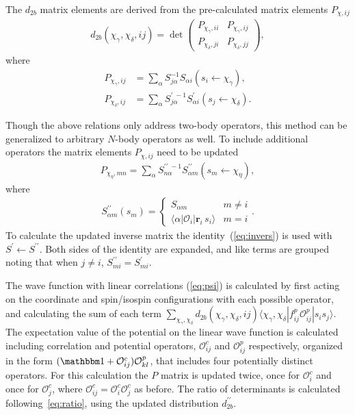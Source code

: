 \documentclass[aps,prc,twocolumn,superscriptaddress,floatfix]{revtex4-1}
\begin{document}
The $d_{2b}$ matrix elements are derived from the pre-calculated matrix elements $P_{\chi,ij}$
\begin{align}
   d_{2b}(\chi_\gamma,\chi_\delta,ij)=\det\begin{pmatrix}P_{\chi_\gamma,ii} & P_{\chi_\gamma,ij} \\ P_{\chi_\delta,ji} & P_{\chi_\delta,jj}\end{pmatrix} ,
\end{align}
where
\begin{align}
   P_{\chi_\gamma,ij} &=\sum_\alpha S^{-1}_{j\alpha}S_{\alpha i}(s_i\leftarrow \chi_\gamma) , \nonumber \\
   P_{\chi_\delta,ij} &=\sum_\alpha S^{\prime\;-1}_{j\alpha}S^\prime_{\alpha i}(s_j\leftarrow \chi_\delta) .
\end{align}

Though the above relations only address two-body operators, 
this method can be generalized to arbitrary $N$-body operators as well. 
To include additional operators the matrix elements $P_{\chi,ij}$ need to be updated
\begin{align}
   P_{\chi_\eta,mn}=\sum_\alpha S^{\prime\prime\;-1}_{n\alpha}S^{\prime\prime}_{\alpha m}(s_m\leftarrow \chi_\eta) ,
\end{align}
where
\begin{align}
   S^{\prime\prime}_{\alpha m}(s_m) = \left\{
   \begin{array}{cc}
      S_{\alpha m} & m \ne i\\
      \langle\alpha|\mathcal O_i|\mathbf{r}_i\,s_i\rangle  & m = i
   \end{array} .
   \right.
\end{align}
To calculate the updated inverse matrix the identity~(\ref{eq:invers}) 
is used with $S^\prime\leftarrow S^{\prime\prime}$. 
Both sides of the identity are expanded, and like terms are grouped 
noting that when $j \ne i$, $S^{\prime\prime}_{mi}=S^\prime_{mi}$.

The wave function with linear correlations (\cref{eq:psi}) is calculated 
by first acting on the coordinate and spin/isospin configurations with 
each possible operator, and calculating the sum of each term 
$\sum_{\chi_\gamma,\chi_\delta}d_{2b}(\chi_\gamma,\chi_\delta,ij)\langle\chi_\gamma,\chi_\delta|f_{ij}^p\mathcal{O}_{ij}^p|s_i s_j\rangle$. 
The expectation value of the potential on the linear wave function 
is calculated including correlation and potential operators, 
$\mathcal{O}^c_{ij}$ and $\mathcal{O}^p_{ij}$ respectively, 
organized in the form $(\mathbbm1+\mathcal{O}^c_{ij})\mathcal{O}^p_{kl}$,
that includes four potentially distinct operators. 
For this calculation the $P$ matrix is updated twice, 
once for $\mathcal{O}^c_i$ and once for $\mathcal{O}^c_j$, 
where $\mathcal{O}^c_{ij}=\mathcal{O}^c_i\mathcal{O}^c_j$ as before.  
The ratio of determinants is calculated following~\cref{eq:ratio},
using the updated distribution $d^{\prime\prime}_{2b}$.
\end{document}
